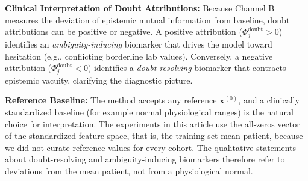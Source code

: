 \documentclass[pdflatex,sn-vancouver-num,referee,lineno]{sn-jnl}
\theoremstyle{thmstyleone}
\theoremstyle{thmstylethree}
\begin{document}
\noindent \textbf{Clinical Interpretation of Doubt Attributions:} Because Channel B measures the deviation of epistemic mutual information from baseline, doubt attributions can be positive or negative. A positive attribution ($\Phi_j^{\text{doubt}} > 0$) identifies an \emph{ambiguity-inducing} biomarker that drives the model toward hesitation (e.g., conflicting borderline lab values). Conversely, a negative attribution ($\Phi_j^{\text{doubt}} < 0$) identifies a \emph{doubt-resolving} biomarker that contracts epistemic vacuity, clarifying the diagnostic picture.

\noindent \textbf{Reference Baseline:} The method accepts any reference $\mathbf{x}^{(0)}$, and a clinically standardized baseline (for example normal physiological ranges) is the natural choice for interpretation. The experiments in this article use the all-zeros vector of the standardized feature space, that is, the training-set mean patient, because we did not curate reference values for every cohort. The qualitative statements about doubt-resolving and ambiguity-inducing biomarkers therefore refer to deviations from the mean patient, not from a physiological normal.
\end{document}
